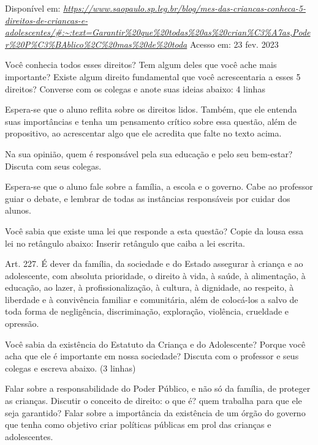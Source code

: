 Disponível em:
\href{https://www.saopaulo.sp.leg.br/blog/mes-das-criancas-conheca-5-direitos-de-criancas-e-adolescentes/\#:~:text=Garantir\%20que\%20todas\%20as\%20crian\%C3\%A7as,Poder\%20P\%C3\%BAblico\%2C\%20mas\%20de\%20toda}{\emph{https://www.saopaulo.sp.leg.br/blog/mes-das-criancas-conheca-5-direitos-de-criancas-e-adolescentes/\#:\textasciitilde{}:text=Garantir\%20que\%20todas\%20as\%20crian\%C3\%A7as,Poder\%20P\%C3\%BAblico\%2C\%20mas\%20de\%20toda}}
Acesso em: 23 fev. 2023

Você conhecia todos esses direitos? Tem algum deles que você ache mais
importante? Existe algum direito fundamental que você acrescentaria a
esses 5 direitos? Converse com os colegas e anote suas ideias abaixo: 4
linhas

Espera-se que o aluno reflita sobre os direitos lidos. Também, que ele
entenda suas importâncias e tenha um pensamento crítico sobre essa
questão, além de propositivo, ao acrescentar algo que ele acredita que
falte no texto acima.

Na sua opinião, quem é responsável pela sua educação e pelo seu
bem-estar? Discuta com seus colegas.

Espera-se que o aluno fale sobre a família, a escola e o governo. Cabe
ao professor guiar o debate, e lembrar de todas as instâncias
responsáveis por cuidar dos alunos.

Você sabia que existe uma lei que responde a esta questão? Copie da
lousa essa lei no retângulo abaixo: Inserir retângulo que caiba a lei
escrita.

Art. 227. É dever da família, da sociedade e do Estado assegurar à
criança e ao adolescente, com absoluta prioridade, o direito à vida, à
saúde, à alimentação, à educação, ao lazer, à profissionalização, à
cultura, à dignidade, ao respeito, à liberdade e à convivência familiar
e comunitária, além de colocá-los a salvo de toda forma de negligência,
discriminação, exploração, violência, crueldade e opressão.

Você sabia da existência do Estatuto da Criança e do Adolescente? Porque
você acha que ele é importante em nossa sociedade? Discuta com o
professor e seus colegas e escreva abaixo. (3 linhas)

Falar sobre a responsabilidade do Poder Público, e não só da família, de
proteger as crianças. Discutir o conceito de direito: o que é? quem
trabalha para que ele seja garantido? Falar sobre a importância da
existência de um órgão do governo que tenha como objetivo criar
políticas públicas em prol das crianças e adolescentes.

